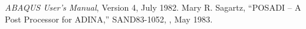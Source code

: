 \setlength{\itemsep}{\bigskipamount} 
\begin{thebibliography}{99}
%
{\em ABAQUS User's Manual}, Version 4, July 1982.
%
Mary R. Sagartz, ``POSADI -- A Post Processor for ADINA,''
SAND83-1052, \SNLA, May 1983.
%

%

%

%

%
\end{thebibliography}
